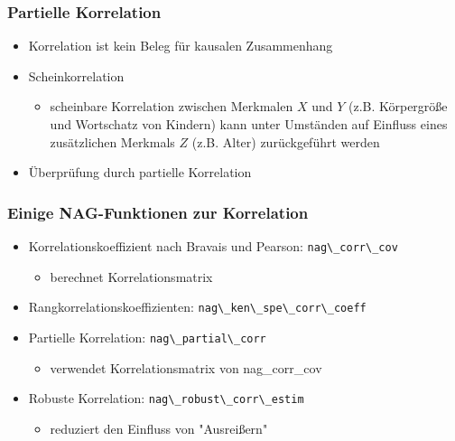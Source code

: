 \documentclass{beamer}
\begin{document}
\begin{frame}
	
	\frametitle{Partielle Korrelation}
	
	\begin{itemize}
		
		\item Korrelation ist kein Beleg f\"ur kausalen Zusammenhang
		
		\item Scheinkorrelation
		\begin{itemize}
			\item scheinbare Korrelation zwischen Merkmalen $X$ und $Y$ (z.B. K\"orpergr\"o\ss e und Wortschatz von Kindern) kann unter Umst\"anden auf Einfluss eines zus\"atzlichen Merkmals $Z$ (z.B. Alter) zur\"uckgef\"uhrt werden
		\end{itemize}
		
		\item \"Uberpr\"ufung durch partielle Korrelation
		
	\end{itemize}
	
\end{frame}

\begin{frame}

	\frametitle{Einige NAG-Funktionen zur Korrelation}
 
	\begin{itemize}

		\item Korrelationskoeffizient nach Bravais und Pearson: \hfill \lstinline{nag\_corr\_cov}
		\begin{itemize}
			\item berechnet Korrelationsmatrix
		\end{itemize}
		
		\item Rangkorrelationskoeffizienten: \hfill \lstinline{nag\_ken\_spe\_corr\_coeff}

		\item Partielle Korrelation: \hfill \lstinline{nag\_partial\_corr}
		\begin{itemize}
			\item verwendet Korrelationsmatrix von nag\_corr\_cov
		\end{itemize}
		
		\item Robuste Korrelation: \hfill \lstinline{nag\_robust\_corr\_estim}
		\begin{itemize}
			\item reduziert den Einfluss von "Ausrei\ss ern"
		\end{itemize}

	\end{itemize}

\end{frame}
\end{document}
